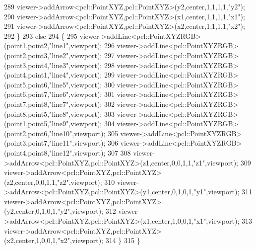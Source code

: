 \begin{DoxyCode}
289         viewer->addArrow<pcl::PointXYZ,pcl::PointXYZ>(y2,center,1,1,1,1,\textcolor{stringliteral}{"y2"});
290         viewer->addArrow<pcl::PointXYZ,pcl::PointXYZ>(x1,center,1,1,1,1,\textcolor{stringliteral}{"x1"});
291         viewer->addArrow<pcl::PointXYZ,pcl::PointXYZ>(x2,center,1,1,1,1,\textcolor{stringliteral}{"x2"});
292     \}
293     \textcolor{keywordflow}{else}
294     \{
295         viewer->addLine<pcl::PointXYZRGB>(point1,point2,\textcolor{stringliteral}{"line1"},viewport);
296         viewer->addLine<pcl::PointXYZRGB>(point2,point3,\textcolor{stringliteral}{"line2"},viewport);
297         viewer->addLine<pcl::PointXYZRGB>(point3,point4,\textcolor{stringliteral}{"line3"},viewport);
298         viewer->addLine<pcl::PointXYZRGB>(point4,point1,\textcolor{stringliteral}{"line4"},viewport);
299         viewer->addLine<pcl::PointXYZRGB>(point5,point6,\textcolor{stringliteral}{"line5"},viewport);
300         viewer->addLine<pcl::PointXYZRGB>(point6,point7,\textcolor{stringliteral}{"line6"},viewport);
301         viewer->addLine<pcl::PointXYZRGB>(point7,point8,\textcolor{stringliteral}{"line7"},viewport);
302         viewer->addLine<pcl::PointXYZRGB>(point8,point5,\textcolor{stringliteral}{"line8"},viewport);
303         viewer->addLine<pcl::PointXYZRGB>(point1,point5,\textcolor{stringliteral}{"line9"},viewport);
304         viewer->addLine<pcl::PointXYZRGB>(point2,point6,\textcolor{stringliteral}{"line10"},viewport);
305         viewer->addLine<pcl::PointXYZRGB>(point3,point7,\textcolor{stringliteral}{"line11"},viewport);
306         viewer->addLine<pcl::PointXYZRGB>(point4,point8,\textcolor{stringliteral}{"line12"},viewport);
307         
308         viewer->addArrow<pcl::PointXYZ,pcl::PointXYZ>(z1,center,0,0,1,1,\textcolor{stringliteral}{"z1"},viewport);
309         viewer->addArrow<pcl::PointXYZ,pcl::PointXYZ>(z2,center,0,0,1,1,\textcolor{stringliteral}{"z2"},viewport);
310         viewer->addArrow<pcl::PointXYZ,pcl::PointXYZ>(y1,center,0,1,0,1,\textcolor{stringliteral}{"y1"},viewport);
311         viewer->addArrow<pcl::PointXYZ,pcl::PointXYZ>(y2,center,0,1,0,1,\textcolor{stringliteral}{"y2"},viewport);
312         viewer->addArrow<pcl::PointXYZ,pcl::PointXYZ>(x1,center,1,0,0,1,\textcolor{stringliteral}{"x1"},viewport);
313         viewer->addArrow<pcl::PointXYZ,pcl::PointXYZ>(x2,center,1,0,0,1,\textcolor{stringliteral}{"x2"},viewport);
314     \}
315 \}
\end{DoxyCode}
